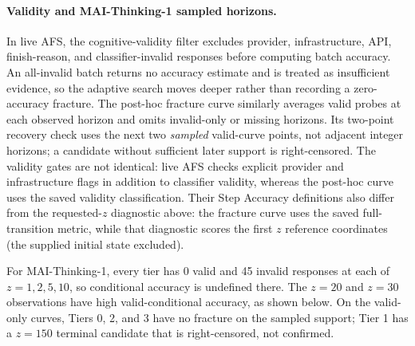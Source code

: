 \documentclass{article}
\begin{document}
\paragraph{Validity and MAI-Thinking-1 sampled horizons.}
In live AFS, the cognitive-validity filter excludes provider, infrastructure,
API, finish-reason, and classifier-invalid responses before computing batch accuracy.
An all-invalid batch returns no accuracy estimate and is treated as
insufficient evidence, so the adaptive search moves deeper rather than
recording a zero-accuracy fracture. The post-hoc fracture curve
similarly averages valid probes at each observed horizon and omits invalid-only
or missing horizons. Its two-point recovery check uses the next two
\emph{sampled} valid-curve points, not adjacent integer horizons; a candidate
without sufficient later support is right-censored. The validity gates are not
identical: live AFS checks explicit provider and infrastructure flags in
addition to classifier validity, whereas the post-hoc curve uses the
saved validity classification. Their Step Accuracy definitions also differ
from the requested-$z$ diagnostic above: the fracture curve uses the saved
full-transition metric, while that diagnostic scores the first $z$ reference
coordinates (the supplied initial state excluded).

For MAI-Thinking-1, every tier has 0 valid and 45 invalid responses at each of
$z=1,2,5,10$, so conditional accuracy is undefined there. The $z=20$ and
$z=30$ observations have high valid-conditional accuracy, as shown below.
On the valid-only curves,
Tiers 0, 2, and 3 have no fracture on the sampled support; Tier 1 has a
$z=150$ terminal candidate that is right-censored, not confirmed.
\end{document}
